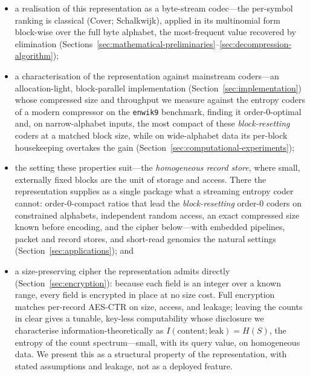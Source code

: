 \documentclass[entropy,article,submit,oneauthor,pdftex]{Definitions/mdpi}
\begin{document}
\begin{itemize}[label=$\bullet$]
  \item a realisation of this representation as a byte-stream codec---the per-symbol ranking
        is classical (Cover; Schalkwijk), applied in its multinomial form block-wise over the
        full byte alphabet, the most-frequent value recovered by elimination
        (Sections~\ref{sec:mathematical-preliminaries}--\ref{sec:decompression-algorithm});
  \item a characterisation of the representation against mainstream coders---an
        allocation-light, block-parallel implementation (Section~\ref{sec:implementation})
        whose compressed size and throughput we measure against the entropy coders of a
        modern compressor on the \texttt{enwik9} benchmark, finding it order-$0$-optimal and,
        on narrow-alphabet inputs, the most compact of these \emph{block-resetting} coders at
        a matched block size, while on wide-alphabet data its per-block housekeeping overtakes
        the gain (Section~\ref{sec:computational-experiments});
  \item the setting these properties suit---the \emph{homogeneous record store}, where small,
        externally fixed blocks are the unit of storage and access. There the representation
        supplies as a single package what a streaming entropy coder cannot: order-$0$-compact
        ratios that lead the \emph{block-resetting} order-$0$ coders on constrained alphabets,
        independent random access, an exact compressed size known before encoding, and the
        cipher below---with embedded pipelines, packet and record stores, and short-read
        genomics the natural settings (Section~\ref{sec:applications}); and
  \item a size-preserving cipher the representation admits directly
        (Section~\ref{sec:encryption}): because each field is an integer over a known range,
        every field is encrypted in place at no size cost. Full encryption matches per-record
        AES-CTR on size, access, and leakage; leaving the counts in clear gives a tunable,
        key-less computability whose disclosure we characterise information-theoretically as
        $I(\text{content};\text{leak})=H(S)$, the entropy of the count spectrum---small, with
        its query value, on homogeneous data. We present this as a structural property of the
        representation, with stated assumptions and leakage, not as a deployed feature.
\end{itemize}
\end{document}
